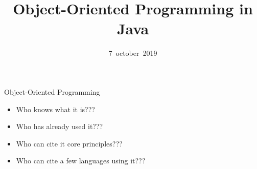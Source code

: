 \documentclass[English,t,%
hyperref={%
    pdftitle={FISA-DE2 OOP in Java},%
    pdfauthor={Guillaume Muller},%
    pdfsubject={OOP in Java},%
    pdfkeywords={OOP,Java}%
    },%
xcolor={pdftex,svgnames} %
]{beamer}
\title[OOP in Java]{Object-Oriented Programming in Java}
\author[\me{}]{\me{}}
\institute[TSÉ + LHC]{
  \inst{Telecom Saint-Étienne, Laboratoire Hubert-Curien}%
}
\date[10:07/2019]{7~october~2019}
\begin{document}
\begin{frame}
  \titlepage
\end{frame}


\begin{frame}{Object-Oriented Programming}

  \begin{itemize}
%
    \item Who knows what it is???
%
    \item Who has already used it???
%
    \item Who can cite it core principles???
%
    \item Who can cite a few languages using it???
%
  \end{itemize}

\end{frame}
\end{document}
